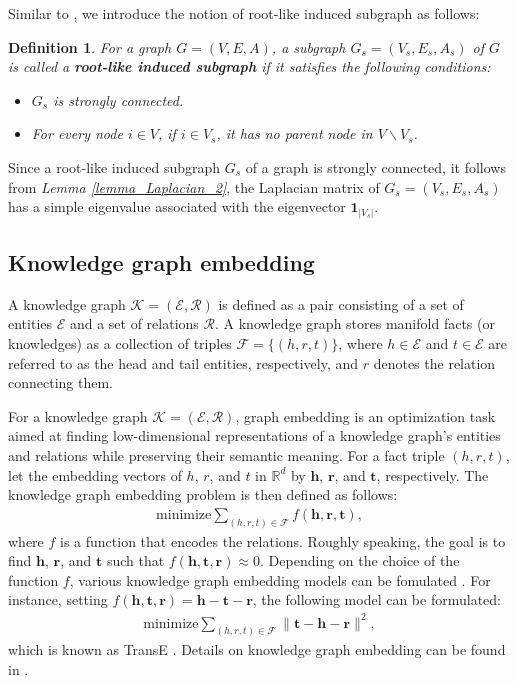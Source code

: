 \documentclass{ifacconf}
\newtheorem{definition}{Definition}[section]
\begin{document}
Similar to \cite{niezink2011consensus}, we introduce the notion of root-like induced subgraph as follows:
\begin{definition}
For a graph $G = (V, E, A)$, a subgraph $G_s = (V_s, E_s, A_s)$ of $G$  is called a \textbf{root-like induced subgraph} if it satisfies the following conditions:
\begin{itemize}
\item $G_s$ is strongly connected.
\item For every node $i \in V$, if $i \in V_s$, it has no parent node in $V \backslash V_s$.
\end{itemize}
\end{definition}
Since a root-like induced subgraph $G_s$ of a graph is strongly connected, it follows from \textit{Lemma \ref{lemma_Laplacian_2}}, the Laplacian matrix of $G_s  = (V_s, E_s, A_s)$ has a simple eigenvalue associated with the eigenvector $\mathbf{1}_{|V_s|}$. %


\subsection{Knowledge graph embedding}

A knowledge graph $\mathcal{K} = (\mathcal{E},\mathcal{R})$ is defined as a pair consisting of a set of entities $\mathcal{E}$ and a set of relations $\mathcal{R}$. 
A knowledge graph stores manifold facts (or knowledges) as a collection of triples $\mathcal{F}=\{(h,r,t)\}$, where $h \in \mathcal{E}$ and $t  \in \mathcal{E}$ are referred to as the head and tail entities, respectively, and $r$ denotes the relation connecting them. 

For a knowledge graph $\mathcal{K} = (\mathcal{E},\mathcal{R})$, graph embedding is an optimization task aimed at finding low-dimensional representations of a knowledge graph’s entities and relations while preserving their semantic meaning. For a fact triple $(h,r,t)$, let the embedding vectors of $h$, $r$, and $t$  in $\mathbb{R}^d$ by $\mathbf{h}$, $\mathbf{r}$, and $\mathbf{t}$, respectively. The knowledge graph embedding problem is then defined as follows:
\begin{align} \label{eq_kge}
\textrm{minimize} \sum_{(h,r,t) \in \mathcal{F}} f(\mathbf{h},\mathbf{r},\mathbf{t}),
\end{align}
where $f$ is a function that encodes the relations. Roughly speaking, the goal is to find $\mathbf{h}$, $\mathbf{r}$, and $\mathbf{t}$ such that $f( \mathbf{h}, \mathbf{t}, \mathbf{r}) \approx 0$. Depending on the choice of the function $f$, various knowledge graph embedding models can be fomulated \citep{wang_knowledge_2017, cao2024knowledge}. For instance, setting $f(\mathbf{h},\mathbf{t},\mathbf{r}) = \mathbf{h} -\mathbf{t} - \mathbf{r}$, the following model can be formulated:
\begin{align} \label{eq_transe}
\textrm{minimize} \sum_{(h,r,t) \in {\mathcal{F}}} \| \mathbf{t}-\mathbf{h} - \mathbf{r} \|^2,
\end{align}
which is known as TransE \citep{bordes_translating_2013}. Details on knowledge graph embedding can be found in \cite{wang_knowledge_2017, cao2024knowledge}.
\end{document}
